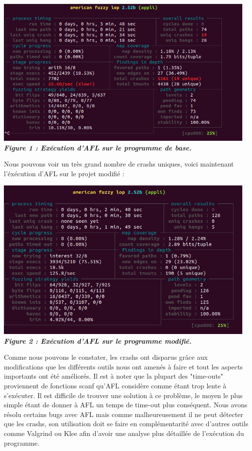 \documentclass{report}
\begin{document}
\begin{center}
  \includegraphics[width=13cm]{captureafl1.png}
\textbf{\textit{Figure 1 : Exécution d'AFL sur le programme de base.}}
\end{center}

Nous pouvons voir un très grand nombre de crashs uniques, voici maintenant l'éxécution d'AFL sur le projet modifié : 

\begin{center}
  \includegraphics[width=13cm]{captureafl2.png}
\textbf{\textit{Figure 2 : Exécution d'AFL sur le programme modifié.}}
\end{center}
\newpage
Comme nous pouvons le constater, les crashs ont disparus grâce aux modifications que les différents outils nous ont amenés à faire et tout les aspects importants ont été améliorés. Il est à noter que la plupart des "time-outs" proviennent de fonctions scanf qu'AFL considère comme étant trop lente à s'exécuter. Il est difficile de trouver une solution à ce problème, le moyen le plus simple étant de donner à AFL un temps de time-out plus conséquent. 
\newline
Nous avons résolu certains bugs avec AFL mais comme malheureusement il ne peut détecter que les crashs, son utilisation doit se faire en complémentarité avec d'autres outils comme Valgrind ou Klee afin d'avoir une analyse plus détaillée de l'exécution du programme.
\end{document}
